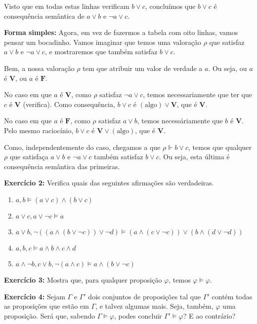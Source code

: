 \documentclass{article}
\theoremstyle{definition}
\theoremstyle{remark}
\newcommand{\V}{\mathbf{V}}
\newcommand{\F}{\mathbf{F}}
\begin{document}
	Visto que em todas estas linhas verificam $b \lor c$, concluímos que $b \lor c$ é consequência semântica de $a\lor b$ e $\neg a \lor c$.
	
	\medskip
	
	\textbf{Forma simples:} Agora, em vez de fazermos a tabela com oito linhas, vamos pensar um bocadinho. Vamos imaginar que temos uma valoração $\rho$ que satisfaz $a\lor b$ e $\neg a \lor c$, e mostraremos que também satisfaz $b \lor c$.
	
	Bem, a nossa valoração $\rho$ tem que atribuir um valor de verdade a $a$. Ou seja, ou $a$ é $\V$, ou $a$ é $\F$.
	
	No caso em que $a$ é $\V$, como $\rho$ satisfaz $\neg a \lor c$, temos necessariamente que ter que $c$ é $\V$ (verifica). Como consequência, $b \lor c$ é $(\text{algo}) \lor \V$, que é $\V$.
	
	No caso em que $a$ é $\F$, como $\rho$ satisfaz $a \lor b$, temos necessáriamente que $b$ é $\V$. Pelo mesmo raciocínio, $b \lor c$ é $\V \lor (\text{algo})$, que é $\V$.
	
	Como, independentemente do caso, chegamos a que $\rho \Vdash b \lor c$, temos que qualquer $\rho$ que satisfaça $a\lor b$ e $\neg a \lor c$ também satisfaz $b \lor c$. Ou seja, esta última é consequência semântica das primeiras.
	
	\bigskip
		
	\textbf{Exercício 2:} Verifica quais das seguintes afirmações são verdadeiras.
	
	\begin{enumerate}
	\item $a, b \vDash (a \lor c) \land (b \lor c)$
	
	\item $a \lor c, a \lor \neg c \vDash a$
	
	\item $a \lor b, \neg( (a \land (b \lor \neg c)) \lor \neg d) \vDash (a \land (c \lor \neg c)) \lor (b \land (d \lor \neg d))$
	
	\item $a, b, c \vDash a \land b \land c \land d$
	
	\item $a \land \neg b, c \lor b, \neg(a \land c) \vDash a \land (b \lor \neg c)$
	\end{enumerate}
	
	\textbf{Exercício 3:} Mostra que, para qualquer proposição $\varphi$, temos $\varphi \vDash \varphi$.
	
	\smallskip
	
	\textbf{Exercício 4:} Sejam $\Gamma$ e $\Gamma'$ dois conjuntos de proposições tal que $\Gamma'$ contém todas as proposições que estão em $\Gamma$, e talvez algumas mais. Seja, também, $\varphi$ uma proposição. Será que, sabendo $\Gamma \vDash \varphi$, podes concluir $\Gamma' \vDash \varphi$? E ao contrário?

	\smallskip
	
	
\end{document}
